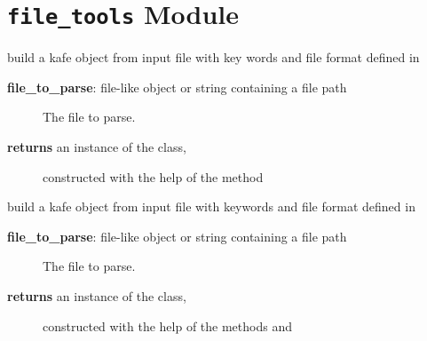 \documentclass[a4paper,10pt,english]{sphinxmanual}
\begin{document}
\section{\texttt{file\_tools} Module}
\label{index:file-tools-module}\label{index:module-kafe.file_tools}\label{index:module-file_tools}

\begin{fulllineitems}
\label{index:kafe.file_tools.buildDataset_fromFile}
build a kafe  object from input file with key words
and file format defined in 
\begin{description}
\item[{\textbf{file\_to\_parse}:  file-like object or string containing a file path}] \leavevmode
The file to parse.

\item[{\textbf{returns} an instance of the  class,}] \leavevmode
constructed with the help of the method 

\end{description}

\end{fulllineitems}


\begin{fulllineitems}
\label{index:kafe.file_tools.buildFit_fromFile}
build a kafe  object from input file with keywords
and file format defined in 
\begin{description}
\item[{\textbf{file\_to\_parse}:  file-like object or string containing a file path}] \leavevmode
The file to parse.

\item[{\textbf{returns} an instance of the  class,}] \leavevmode
constructed with the help of the methods
 and

\end{description}

\end{fulllineitems}
\end{document}
